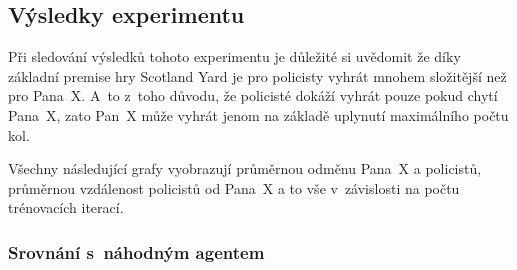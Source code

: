 \subsection{Výsledky experimentu}
\label{subsec:vysledky-experimentu-1}

Při sledování výsledků tohoto experimentu je důležité si uvědomit že díky základní premise hry Scotland Yard je pro policisty vyhrát mnohem složitější než pro Pana~X\@.
A~to z~toho důvodu, že  policisté dokáží vyhrát pouze pokud chytí Pana~X, zato Pan~X může vyhrát jenom na základě uplynutí maximálního počtu kol.

Všechny následující grafy vyobrazují průměrnou odměnu Pana~X a policistů, průměrnou vzdálenost policistů od Pana~X a to vše v~závislosti na počtu trénovacích iterací.

\subsubsection*{Srovnání s~náhodným agentem}
